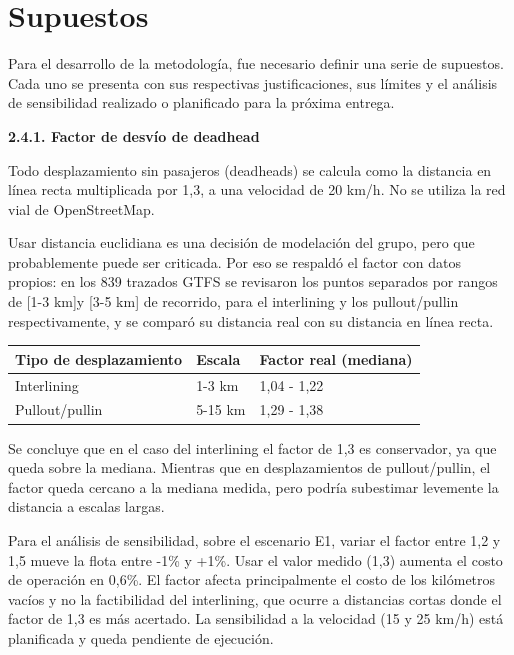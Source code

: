 \section{Supuestos}
\label{sec:supuestos-informe2}

Para el desarrollo de la metodología, fue necesario definir una serie de supuestos. Cada uno se presenta con sus respectivas justificaciones, sus límites y el análisis de sensibilidad realizado o planificado para la próxima entrega.

\textbf{2.4.1. Factor de desvío de deadhead}

Todo desplazamiento sin pasajeros (deadheads) se calcula como la distancia en línea recta multiplicada por 1,3, a una velocidad de 20 km/h. No se utiliza la red vial de OpenStreetMap.

Usar distancia euclidiana es una decisión de modelación del grupo, pero que probablemente puede ser criticada. Por eso se respaldó el factor con datos propios: en los 839 trazados GTFS se revisaron los puntos separados por rangos de [1-3 km]y [3-5 km] de recorrido, para el interlining y los pullout/pullin respectivamente, y se comparó su distancia real con su distancia en línea recta. 

    \begin{center}
    \begin{tabular}{|p{4.3cm}|p{3cm}|p{4cm}|}
    \hline
    Tipo de desplazamiento & Escala & Factor real (mediana) \\
    \hline
    Interlining & 1-3 km & 1,04 - 1,22 \\
    \hline
    Pullout/pullin & 5-15 km & 1,29 - 1,38 \\
    \hline
    \end{tabular}
    \end{center}

Se concluye que en el caso del interlining el factor de 1,3 es conservador, ya que queda sobre la mediana. Mientras que en desplazamientos de pullout/pullin, el factor queda cercano a la mediana medida, pero podría subestimar levemente la distancia a escalas largas.

Para el análisis de sensibilidad, sobre el escenario E1, variar el factor entre 1,2 y 1,5 mueve la flota entre -1\% y +1\%. Usar el valor medido (1,3) aumenta el costo de operación en 0,6\%. El factor afecta principalmente el costo de los kilómetros vacíos y no la factibilidad del interlining, que ocurre a distancias cortas donde el factor de 1,3 es más acertado. La sensibilidad a la velocidad (15 y 25 km/h) está planificada y queda pendiente de ejecución.

